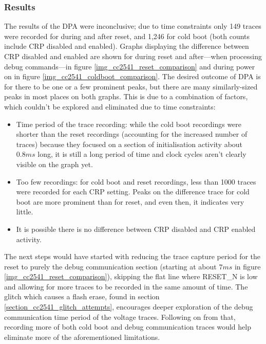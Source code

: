 \hypertarget{results}{%
\subsubsection{Results}\label{results}}

The results of the DPA were inconclusive; due to time constraints only
149 traces were recorded for during and after reset, and 1,246 for cold
boot (both counts include CRP disabled and enabled). Graphs displaying
the difference between CRP disabled and enabled are shown for during
reset and after---when processing debug commands---in figure
\ref{img_cc2541_reset_comparison} and during power on in figure
\ref{img_cc2541_coldboot_comparison}. The desired outcome of DPA is for
there to be one or a few prominent peaks, but there are many
similarly-sized peaks in most places on both graphs. This is due to a
combination of factors, which couldn't be explored and eliminated due to
time constraints:

\begin{itemize}
\tightlist
\item
  Time period of the trace recording: while the cold boot recordings
  were shorter than the reset recordings (accounting for the increased
  number of traces) because they focused on a section of initialisation
  activity about \(0.8ms\) long, it is still a long period of time and
  clock cycles aren't clearly visible on the graph yet.
\item
  Too few recordings: for cold boot and reset recordings, less than 1000
  traces were recorded for each CRP setting. Peaks on the difference
  trace for cold boot are more prominent than for reset, and even then,
  it indicates very little.
\item
  It is possible there is no difference between CRP disabled and CRP
  enabled activity.
\end{itemize}

The next steps would have started with reducing the trace capture period
for the reset to purely the debug communication section (starting at
about \(7ms\) in figure \ref{img_cc2541_reset_comparison}), skipping the
flat line where RESET\_N is low and allowing for more traces to be
recorded in the same amount of time. The glitch which causes a flash
erase, found in section \ref{section_cc2541_glitch_attempts}, encourages
deeper exploration of the debug communication time period of the voltage
traces. Following on from that, recording more of both cold boot and
debug communication traces would help eliminate more of the
aforementioned limitations.

